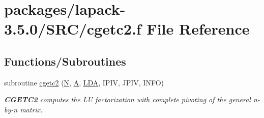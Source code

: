 \hypertarget{cgetc2_8f}{}\section{packages/lapack-\/3.5.0/\+S\+R\+C/cgetc2.f File Reference}
\label{cgetc2_8f}
\subsection*{Functions/\+Subroutines}
\begin{DoxyCompactItemize}
\item 
subroutine \hyperlink{group__complexGEauxiliary_gabe14160a9bd237d70974c6ffda7baeba}{cgetc2} (\hyperlink{polmisc_8c_a0240ac851181b84ac374872dc5434ee4}{N}, \hyperlink{classA}{A}, \hyperlink{example__user_8c_ae946da542ce0db94dced19b2ecefd1aa}{L\+D\+A}, I\+P\+I\+V, J\+P\+I\+V, I\+N\+F\+O)
\begin{DoxyCompactList}\small\item\em {\bfseries C\+G\+E\+T\+C2} computes the L\+U factorization with complete pivoting of the general n-\/by-\/n matrix. \end{DoxyCompactList}\end{DoxyCompactItemize}
